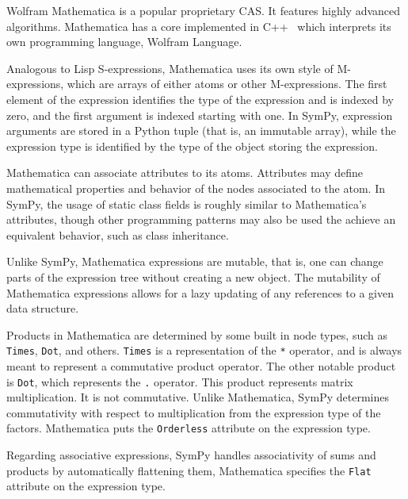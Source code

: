 
Wolfram Mathematica is a popular proprietary CAS\@.
It features highly advanced algorithms.
Mathematica has a core implemented in C++~\cite{Wolfram2016}
which interprets its own programming language, Wolfram Language.


Analogous to Lisp S-expressions,
Mathematica uses its own style of M-expres\-sions,
which are arrays of either atoms or other M-expressions.
The first element of the expression identifies the type of the expression
and is indexed by zero, and the first argument is indexed starting with one.
In SymPy, expression arguments are stored in a Python tuple
(that is, an immutable array),
while the expression type is identified by the type of the object storing the
expression.


Mathematica can associate attributes to its atoms.
Attributes may define mathematical properties and behavior of the nodes
associated to the atom.
In SymPy, the usage of static class fields is roughly similar to Mathematica's
attributes, though other programming patterns may also be used the achieve an
equivalent behavior, such as class inheritance.


Unlike SymPy, Mathematica expressions are mutable,
that is, one can change parts of the expression tree without
creating a new object.
The mutability of Mathematica expressions allows for a lazy updating of any references
to a given data structure.


Products in Mathematica are determined by some built in node types, such as
\texttt{Times}, \texttt{Dot}, and others.  \texttt{Times} is a representation of
the \texttt{*} operator, and is always meant to represent a commutative product
operator.  The other notable product is \texttt{Dot}, which represents the
\texttt{.} operator.  This product represents matrix multiplication. It is not
commutative.  Unlike
Mathematica, SymPy determines commutativity with respect to multiplication from
the expression type of the factors.  Mathematica puts the \texttt{Orderless} attribute
on the expression type.


Regarding associative expressions,
SymPy handles associativity of sums and products by automatically flattening them,
Mathematica specifies the \texttt{Flat}~\cite{WolframRefFlat} attribute on the expression type.

